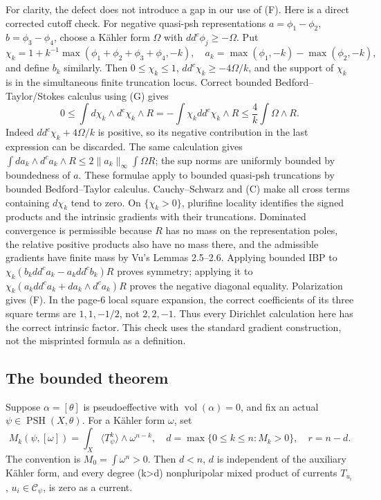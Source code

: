 \documentclass[
  11pt,
]{article}
\begin{document}
For clarity, the defect does not introduce a gap in our use of (F). Here
is a direct corrected cutoff check. For negative quasi-psh
representations \(a=\phi_1-\phi_2\), \(b=\phi_3-\phi_4\), choose a
Kähler form \(\Omega\) with \(dd^c\phi_j\geq-\Omega\). Put \[
\chi_k=1+k^{-1}\max(\phi_1+\phi_2+\phi_3+\phi_4,-k),\quad
a_k=\max(\phi_1,-k)-\max(\phi_2,-k),
\] and define \(b_k\) similarly. Then \(0\leq\chi_k\leq1\),
\(dd^c\chi_k\geq-4\Omega/k\), and the support of \(\chi_k\) is in the
simultaneous finite truncation locus. Correct bounded
Bedford--Taylor/Stokes calculus using (G) gives \[
0\leq\int d\chi_k\wedge d^c\chi_k\wedge R
=-\int\chi_kdd^c\chi_k\wedge R
\leq\frac4k\int\Omega\wedge R.
\tag{C}
\] Indeed \(dd^c\chi_k+4\Omega/k\) is positive, so its negative
contribution in the last expression can be discarded. The same
calculation gives
\(\int da_k\wedge d^ca_k\wedge R\leq2\|a_k\|_\infty\int\Omega R\); the
sup norms are uniformly bounded by boundedness of \(a\). These formulae
apply to bounded quasi-psh truncations by bounded Bedford--Taylor
calculus. Cauchy--Schwarz and (C) make all cross terms containing
\(d\chi_k\) tend to zero. On \(\{\chi_k>0\}\), plurifine locality
identifies the signed products and the intrinsic gradients with their
truncations. Dominated convergence is permissible because \(R\) has no
mass on the representation poles, the relative positive products also
have no mass there, and the admissible gradients have finite mass by
Vu's Lemmas 2.5--2.6. Applying bounded IBP to
\(\chi_k(b_kdd^ca_k-a_kdd^cb_k)R\) proves symmetry; applying it to
\(\chi_k(a_kdd^ca_k+da_k\wedge d^ca_k)R\) proves the negative diagonal
equality. Polarization gives (F). In the page-6 local square expansion,
the correct coefficients of its three square terms are \(1,1,-1/2\), not
\(2,2,-1\). Thus every Dirichlet calculation here has the correct
intrinsic factor. This check uses the standard gradient construction,
not the misprinted formula as a definition.

\subsection{The bounded theorem}\label{the-bounded-theorem}

Suppose \(\alpha=[\theta]\) is pseudoeffective with
\(\operatorname{vol}(\alpha)=0\), and fix an actual
\(\psi\in\operatorname{PSH}(X,\theta)\). For a Kähler form \(\omega\),
set \[
M_k(\psi,[\omega])=\int_X\langle T_\psi^k\rangle\wedge\omega^{n-k},\quad
d=\max\{0\leq k\leq n:M_k>0\},\quad r=n-d.
\tag{1}
\] The convention is \(M_0=\int\omega^n>0\). Then \(d<n\), \(d\) is
independent of the auxiliary Kähler form, and every degree
(k\textgreater d) nonpluripolar mixed product of currents \(T_{u_i}\),
\(u_i\in\mathcal C_\psi\), is zero as a current.
\end{document}
